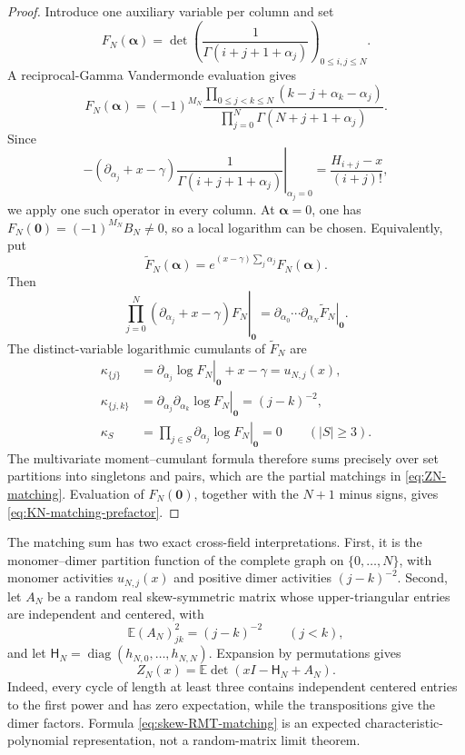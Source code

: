 \documentclass[11pt]{article}
\theoremstyle{definition}
\theoremstyle{remark}
\begin{document}
\begin{proof}
Introduce one auxiliary variable per column and set
\[
 F_N(\boldsymbol\alpha)=
 \det\left(\frac1{\Gamma(i+j+1+\alpha_j)}\right)_{0\leq i,j\leq N}.
\]
A reciprocal-Gamma Vandermonde evaluation gives
\begin{equation}
 F_N(\boldsymbol\alpha)=(-1)^{M_N}
 \frac{\prod_{0\leq j<k\leq N}
 (k-j+\alpha_k-\alpha_j)}
 {\prod_{j=0}^N\Gamma(N+j+1+\alpha_j)}.
 \label{eq:reciprocal-gamma-Vandermonde}
\end{equation}
Since
\[
 -\left.(\partial_{\alpha_j}+x-\gamma)
 \frac1{\Gamma(i+j+1+\alpha_j)}\right|_{\alpha_j=0}
 =\frac{H_{i+j}-x}{(i+j)!},
\]
we apply one such operator in every column.  At
\(\boldsymbol\alpha=0\), one has
\(F_N(\boldsymbol0)=(-1)^{M_N}B_N\neq0\), so a local logarithm can be chosen.
Equivalently, put
\[
 \widetilde F_N(\boldsymbol\alpha)
 =e^{(x-\gamma)\sum_j\alpha_j}F_N(\boldsymbol\alpha).
\]
Then
\[
 \left.\prod_{j=0}^N(\partial_{\alpha_j}+x-\gamma)F_N
 \right|_{\boldsymbol0}
 =
 \left.\partial_{\alpha_0}\cdots\partial_{\alpha_N}\widetilde F_N
 \right|_{\boldsymbol0}.
\]
The distinct-variable logarithmic cumulants of \(\widetilde F_N\) are
\begin{align*}
 \kappa_{\{j\}}
 &=\left.\partial_{\alpha_j}\log F_N\right|_{\boldsymbol0}+x-\gamma
   =u_{N,j}(x),\\
 \kappa_{\{j,k\}}
 &=\left.\partial_{\alpha_j}\partial_{\alpha_k}\log F_N
   \right|_{\boldsymbol0}=(j-k)^{-2},\\
 \kappa_S
 &=\left.\prod_{j\in S}\partial_{\alpha_j}\log F_N
   \right|_{\boldsymbol0}=0\qquad(|S|\geq3).
\end{align*}
The multivariate moment--cumulant formula therefore sums precisely over set
partitions into singletons and pairs, which are the partial matchings in
\eqref{eq:ZN-matching}.  Evaluation of \(F_N(\boldsymbol0)\), together with
the \(N+1\) minus signs, gives
\eqref{eq:KN-matching-prefactor}.
\end{proof}

The matching sum has two exact cross-field interpretations.  First, it is the
monomer--dimer partition function of the complete graph on
\(\{0,\ldots,N\}\), with monomer activities \(u_{N,j}(x)\) and positive dimer
activities \((j-k)^{-2}\).  Second, let \(A_N\) be a random real
skew-symmetric matrix whose upper-triangular entries are independent and
centered, with
\[
 \mathbb E(A_N)_{jk}^2=(j-k)^{-2}\qquad(j<k),
\]
and let
\(\mathsf H_N=\operatorname{diag}(h_{N,0},\ldots,h_{N,N})\).  Expansion by
permutations gives
\begin{equation}
 \boxed{Z_N(x)=\mathbb E\det(xI-\mathsf H_N+A_N).}
 \label{eq:skew-RMT-matching}
\end{equation}
Indeed, every cycle of length at least three contains independent centered
entries to the first power and has zero expectation, while the transpositions
give the dimer factors.  Formula \eqref{eq:skew-RMT-matching} is an expected
characteristic-polynomial representation, not a random-matrix limit theorem.
\end{document}
